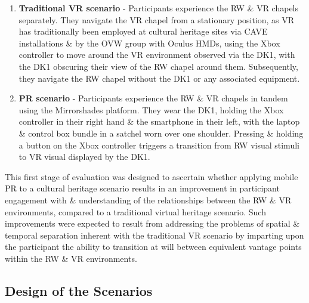 \begin{enumerate}
	\item \textbf{Traditional VR scenario} - Participants experience the RW \& VR chapels separately. They navigate the VR chapel from a stationary position, as VR has traditionally been employed at cultural heritage sites via CAVE installations \& by the OVW group with Oculus HMDs, using the Xbox controller to move around the VR environment observed via the DK1, with the DK1 obscuring their view of the RW chapel around them. Subsequently, they navigate the RW chapel without the DK1 or any associated equipment.
	\item \textbf{PR scenario} - Participants experience the RW \& VR chapels in tandem using the Mirrorshades platform. They wear the DK1, holding the Xbox controller in their right hand \& the smartphone in their left, with the laptop \& control box bundle in a satchel worn over one shoulder. Pressing \& holding a button on the Xbox controller triggers a transition from RW visual stimuli to VR visual displayed by the DK1.
\end{enumerate}

This first stage of evaluation was designed to ascertain whether applying mobile PR to a cultural heritage scenario results in an improvement in participant engagement with \& understanding of the relationships between the RW \& VR environments, compared to a traditional virtual heritage scenario. Such improvements were expected to result from addressing the problems of spatial \& temporal separation inherent with the traditional VR scenario by imparting upon the participant the ability to transition at will between equivalent vantage points within the RW \& VR environments.


\subsection{Design of the Scenarios}

